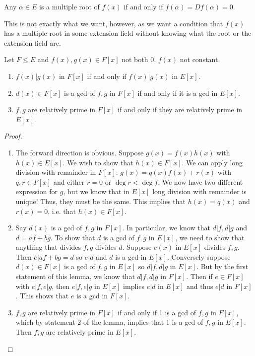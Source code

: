 \documentclass{../mathnotes}
\begin{document}
\begin{thm}
    Any $\alpha\in E$ is a multiple root of $f(x)$ if and only if $f(\alpha)=Df(\alpha)=0$.
\end{thm}

This is not exactly what we want, however, as we want a condition that $f(x)$ has a multiple root in some extension field without knowing
what the root or the extension field are.

\begin{lem}
    Let $F\leq E$ and $f(x),g(x)\in F[x]$ not both 0, $f(x)$ not constant.
    \begin{enumerate}
        \item $f(x)|g(x)$ in $F[x]$ if and only if $f(x)|g(x)$ in $E[x]$.
        \item $d(x)\in F[x]$ is a gcd of $f,g$ in $F[x]$ if and only if it is a gcd in $E[x]$.
        \item $f,g$ are relatively prime in $F[x]$ if and only if they are relatively prime in $E[x]$.
    \end{enumerate}
\end{lem}
\begin{proof}
    \begin{enumerate}
        \item The forward direction is obvious. Suppose $g(x)=f(x)h(x)$ with $h(x)\in E[x]$. We wish to show that $h(x)\in F[x]$.
            We can apply long division with remainder in $F[x]$: $g(x)=q(x)f(x)+r(x)$ with $q,r\in F[x]$ and either $r=0$ or $\deg r<\deg f$.
            We now have two different expression for $g$, but we know that in $E[x]$ long division with remainder is unique! Thus, they must be the same. 
            This implies that $h(x)=q(x)$ and $r(x)=0$, i.e. that $h(x)\in F[x]$.
        \item  Say $d(x)$ is a gcd of $f,g$ in $F[x]$. In particular, we know that $d|f, d|g$ and $d=af+bg$. To show that $d$ is a gcd of
            $f,g$ in $E[x]$, we need to show that anything that divides $f,g$ divides $d$. Suppose $e(x)$ in $E[x]$ divides $f,g$.
            Then $e|af+bg=d$ so $e|d$ and $d$ is a gcd in $E[x]$. Conversely suppose $d(x)\in F[x]$ is a gcd of $f,g$ in $E[x]$ so
            $d|f,d|g$ in $E[x]$. But by the first statement of this lemma, we know that $d|f,d|g$ in $F[x]$. Then if $e\in F[x]$
            with $e|f,e|g$, then $e|f,e|g$ in $E[x]$ implies $e|d$ in $E[x]$ and thus  $e|d$ in $F[x]$. This shows that $e$ is a gcd
            in $F[x]$.
            \item $f,g$ are relatively prime in $F[x]$ if and only if 1 is a gcd of $f,g$ in $F[x]$, which by statement 2 of the lemma,
            implies that 1 is a gcd of $f,g$ in $E[x]$. Then $f,g$ are relatively prime in $E[x]$.
    \end{enumerate}
\end{proof}
\end{document}
